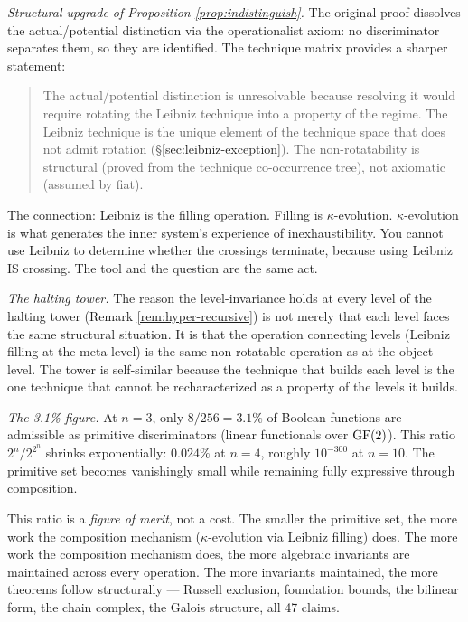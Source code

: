 \emph{Structural upgrade of Proposition
\ref{prop:indistinguish}.}
The original proof dissolves the actual/potential
distinction via the operationalist axiom: no discriminator
separates them, so they are identified. The technique
matrix provides a sharper statement:

\begin{quote}
The actual/potential distinction is unresolvable because
resolving it would require rotating the Leibniz technique
into a property of the regime. The Leibniz technique is
the unique element of the technique space that does not
admit rotation (\S\ref{sec:leibniz-exception}). The
non-rotatability is structural (proved from the technique
co-occurrence tree), not axiomatic (assumed by fiat).
\end{quote}

The connection: Leibniz is the filling operation. Filling
is $\kappa$-evolution. $\kappa$-evolution is what generates
the inner system's experience of inexhaustibility. You
cannot use Leibniz to determine whether the crossings
terminate, because using Leibniz IS crossing. The tool
and the question are the same act.

\emph{The halting tower.}
The reason the level-invariance holds at every level of
the halting tower (Remark \ref{rem:hyper-recursive}) is
not merely that each level faces the same structural
situation. It is that the operation connecting levels
(Leibniz filling at the meta-level) is the same
non-rotatable operation as at the object level. The tower
is self-similar because the technique that builds each
level is the one technique that cannot be recharacterized
as a property of the levels it builds.

\emph{The 3.1\% figure.}
At $n = 3$, only $8/256 = 3.1\%$ of Boolean functions are
admissible as primitive discriminators (linear functionals
over $\operatorname{GF}(2)$). This ratio $2^n / 2^{2^n}$ shrinks
exponentially: $0.024\%$ at $n = 4$, roughly $10^{-300}$
at $n = 10$. The primitive set becomes vanishingly small
while remaining fully expressive through composition.

This ratio is a \emph{figure of merit}, not a cost. The
smaller the primitive set, the more work the composition
mechanism ($\kappa$-evolution via Leibniz filling) does.
The more work the composition mechanism does, the more
algebraic invariants are maintained across every
operation. The more invariants maintained, the more
theorems follow structurally --- Russell exclusion,
foundation bounds, the bilinear form, the chain complex,
the Galois structure, all 47 claims.

